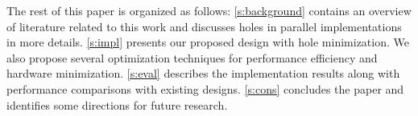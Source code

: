 The rest of this paper is organized as follows:
\autoref{s:background} contains an overview of literature related to this work and discusses holes in parallel implementations in more details.
\autoref{s:impl} presents our proposed design with hole minimization. 
We also propose several optimization techniques for performance efficiency and hardware minimization.
\autoref{s:eval} describes the implementation results along with performance comparisons with existing designs.
\autoref{s:cons} concludes the paper and identifies some directions for future research.
